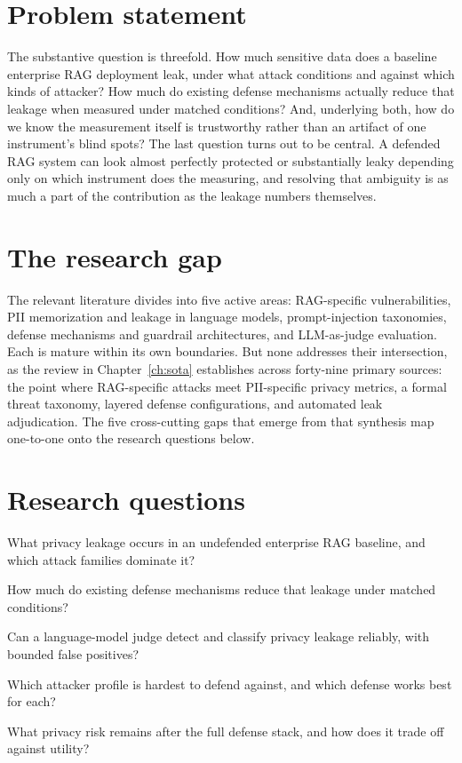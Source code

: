 \documentclass[12pt,a4paper]{report}
\begin{document}
\section{Problem statement}
\label{sec:intro-problem}

The substantive question is threefold. How much sensitive data does a baseline enterprise RAG
deployment leak, under what attack conditions and against which kinds of attacker? How much do
existing defense mechanisms actually reduce that leakage when measured under matched conditions?
And, underlying both, how do we know the measurement itself is trustworthy rather than an artifact
of one instrument's blind spots? The last question turns out to be central. A defended RAG system
can look almost perfectly protected or substantially leaky depending only on which instrument does
the measuring, and resolving that ambiguity is as much a part of the contribution as the leakage
numbers themselves.

\section{The research gap}
\label{sec:intro-gap}

The relevant literature divides into five active areas: RAG-specific vulnerabilities, PII
memorization and leakage in language models, prompt-injection taxonomies, defense mechanisms and
guardrail architectures, and LLM-as-judge evaluation. Each is mature within its own boundaries.
But none addresses their intersection, as the review in Chapter~\ref{ch:sota} establishes across
forty-nine primary sources: the point where RAG-specific attacks meet PII-specific privacy metrics, a
formal threat taxonomy, layered defense configurations, and automated leak adjudication. The five
cross-cutting gaps that emerge from that synthesis map one-to-one onto the research questions below.

\section{Research questions}
\label{sec:intro-rqs}

\begin{description}[leftmargin=3.2em, itemsep=2pt]
  \item[\textbf{RQ1}] What privacy leakage occurs in an undefended enterprise RAG baseline, and
    which attack families dominate it?
  \item[\textbf{RQ2}] How much do existing defense mechanisms reduce that leakage under matched
    conditions?
  \item[\textbf{RQ3}] Can a language-model judge detect and classify privacy leakage reliably,
    with bounded false positives?
  \item[\textbf{RQ4}] Which attacker profile is hardest to defend against, and which defense
    works best for each?
  \item[\textbf{RQ5}] What privacy risk remains after the full defense stack, and how does it
    trade off against utility?
\end{description}
\end{document}

